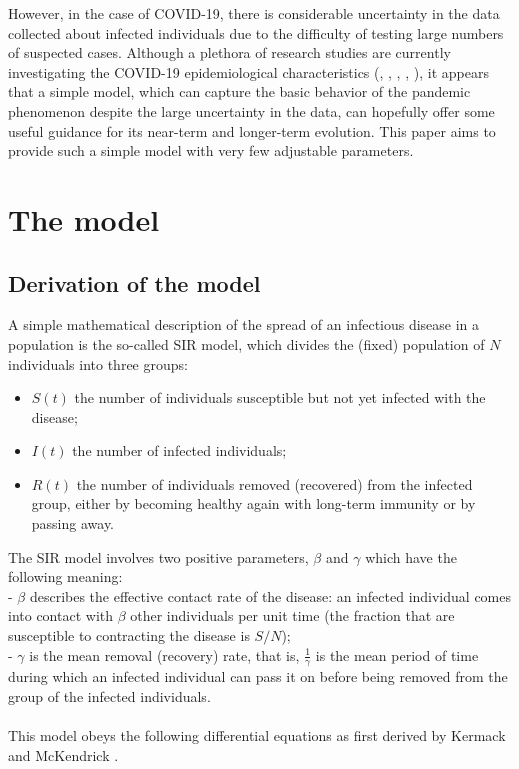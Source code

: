 \documentclass[aps,preprint]{revtex4}
\begin{document}
However, in the case of COVID-19, there is considerable uncertainty in the data collected about infected individuals 
due to the difficulty of testing large numbers of suspected cases. Although a plethora of research studies are currently investigating the COVID-19 epidemiological characteristics (\cite{Sanche_2020}, \cite{Li_2020}, \cite{Imai_2020}, \cite{Rothe_2020}, \cite{Wynants_2020}), it appears that a simple model, which can capture the basic behavior of the 
pandemic phenomenon despite the large uncertainty in the data, can 
hopefully offer some useful guidance for its near-term and longer-term evolution. 
This paper aims to provide such a simple model with very few adjustable parameters.

\section{The model}

\subsection{Derivation of the model}

A simple mathematical description of the spread of an infectious  
disease in a population is the so-called SIR model, 
which divides the (fixed) population of $N$ individuals into three groups:
\begin{itemize}
\item
$S(t)$ the number of individuals susceptible but not yet infected with the disease;
\item
$I(t)$ the number of infected individuals;
\item
$R(t)$ the number of individuals removed (recovered) from the infected group, either by becoming healthy again with long-term immunity or by passing away.
\end{itemize}

The SIR model involves two positive parameters, $\beta$ and $\gamma$ which have the following 
meaning:\\
- $\beta$ describes the effective contact rate of the disease: 
an infected individual comes into contact with $\beta$ other individuals per unit time 
(the fraction that are susceptible to contracting the disease is $S/N$); \\
- $\gamma$ is the mean removal (recovery) rate, that is, $\frac{1}{\gamma}$ is the mean 
period of time during which an infected individual can pass it on before being removed from the group of the infected individuals.\\\\
This model obeys the following differential equations
as first derived by Kermack and McKendrick \cite{Kermack_1927}.
\end{document}
